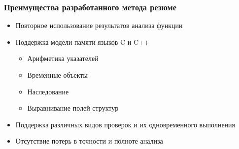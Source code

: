 \documentclass[10pt,gray]{beamer}
\begin{document}
\begin{frame}
\frametitle{Преимущества разработанного метода резюме}
\begin{itemize}
 \item Повторное использование результатов анализа функции
 \item Поддержка модели памяти языков C и C++
  \begin{itemize}
  \item Арифметика указателей
  \item Временные объекты
  \item Наследование
  \item Выравнивание полей структур
  \end{itemize}

 \item Поддержка различных видов проверок и их одновременного выполнения
 \item Отсутствие потерь в точности и полноте анализа
\end{itemize}
\end{frame}


\end{document}
